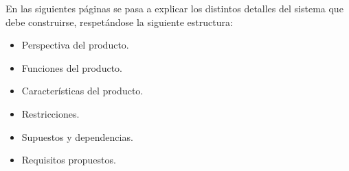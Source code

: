 En las siguientes páginas se pasa a explicar los distintos detalles del sistema que debe construirse, respetándose la siguiente estructura:

\begin{itemize}
    \item Perspectiva del producto.
    \item Funciones del producto.
    \item Características del producto.
    \item Restricciones.
    \item Supuestos y dependencias.
    \item Requisitos propuestos.
\end{itemize}